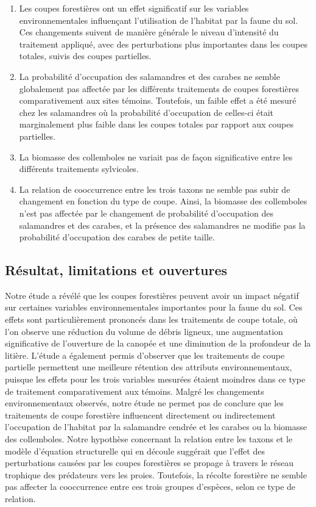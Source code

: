 \begin{enumerate}
  \item Les coupes forestières ont un effet significatif sur les variables environnementales influençant l'utilisation de l'habitat par la faune du sol. Ces changements suivent de manière générale le niveau d'intensité du traitement appliqué, avec des perturbations plus importantes dans les coupes totales, suivis des coupes partielles.
  \item La probabilité d'occupation des salamandres et des carabes ne semble globalement pas affectée par les différents traitements de coupes forestières comparativement aux sites témoins. Toutefois, un faible effet a été mesuré chez les salamandres où la probabilité d'occupation de celles-ci était marginalement plus faible dans les coupes totales par rapport aux coupes partielles.
  \item La biomasse des collemboles ne variait pas de façon significative entre les différents traitements sylvicoles.
  \item La relation de cooccurrence entre les trois taxons ne semble pas subir de changement en fonction du type de coupe. Ainsi, la biomasse des collemboles n'est pas affectée par le changement de probabilité d'occupation des salamandres et des carabes, et la présence des salamandres ne modifie pas la probabilité d'occupation des carabes de petite taille.
\end{enumerate}


\subsection{Résultat, limitations et ouvertures}

Notre étude a révélé que les coupes forestières peuvent avoir un impact négatif sur certaines variables environnementales importantes pour la faune du sol. 
Ces effets sont particulièrement prononcés dans les traitements de coupe totale, où l'on observe une réduction du volume de débris ligneux, une augmentation significative de l'ouverture de la canopée et une diminution de la profondeur de la litière. 
L'étude a également permis d'observer que les traitements de coupe partielle permettent une meilleure rétention des attributs environnementaux, puisque les effets pour les trois variables mesurées étaient moindres dans ce type de traitement comparativement aux témoins.
Malgré les changements environnementaux observés, notre étude ne permet pas de conclure que les traitements de coupe forestière influencent directement ou indirectement l'occupation de l'habitat par la salamandre cendrée et les carabes ou la biomasse des collemboles. 
Notre hypothèse concernant la relation entre les taxons et le modèle d'équation structurelle qui en découle suggérait que l'effet des perturbations causées par les coupes forestières se propage à travers le réseau trophique des prédateurs vers les proies. 
Toutefois, la récolte forestière ne semble pas affecter la cooccurrence entre ces trois groupes d'espèces, selon ce type de relation. 

